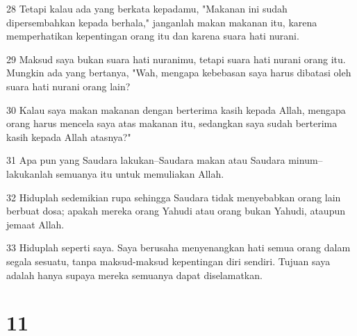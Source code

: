 \par 28 Tetapi kalau ada yang berkata kepadamu, "Makanan ini sudah dipersembahkan kepada berhala," janganlah makan makanan itu, karena memperhatikan kepentingan orang itu dan karena suara hati nurani.
\par 29 Maksud saya bukan suara hati nuranimu, tetapi suara hati nurani orang itu. Mungkin ada yang bertanya, "Wah, mengapa kebebasan saya harus dibatasi oleh suara hati nurani orang lain?
\par 30 Kalau saya makan makanan dengan berterima kasih kepada Allah, mengapa orang harus mencela saya atas makanan itu, sedangkan saya sudah berterima kasih kepada Allah atasnya?"
\par 31 Apa pun yang Saudara lakukan--Saudara makan atau Saudara minum--lakukanlah semuanya itu untuk memuliakan Allah.
\par 32 Hiduplah sedemikian rupa sehingga Saudara tidak menyebabkan orang lain berbuat dosa; apakah mereka orang Yahudi atau orang bukan Yahudi, ataupun jemaat Allah.
\par 33 Hiduplah seperti saya. Saya berusaha menyenangkan hati semua orang dalam segala sesuatu, tanpa maksud-maksud kepentingan diri sendiri. Tujuan saya adalah hanya supaya mereka semuanya dapat diselamatkan.

\chapter{11}

